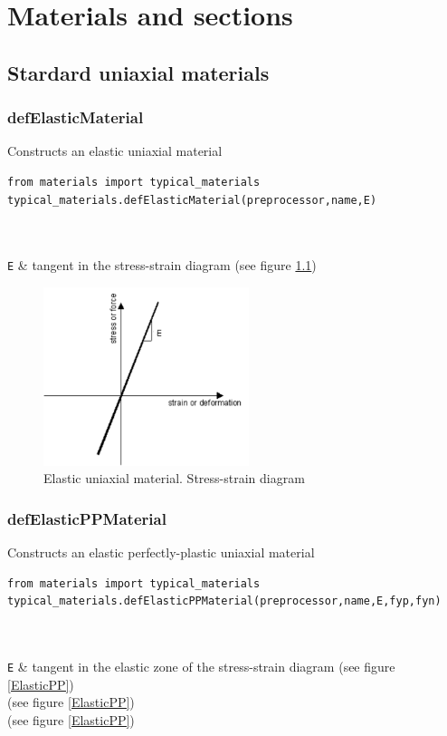 \chapter{Materials and sections}
\section{Stardard uniaxial materials}
\subsection{defElasticMaterial} 
\noindent Constructs an elastic uniaxial material
\begin{verbatim}
from materials import typical_materials
typical_materials.defElasticMaterial(preprocessor,name,E)
\end{verbatim}
\begin{paramFuncTable}
\preprocessor{} \\
 \\
{\tt E} & tangent in the stress-strain diagram (see figure \ref{Elastic}) \\
\end{paramFuncTable}

\begin{figure}[h]
\centering
\includegraphics[width=60mm]{materials/figures/Elastic}
\caption{Elastic uniaxial material. Stress-strain diagram}\label{Elastic}
\end{figure}

\subsection{defElasticPPMaterial}
\noindent Constructs an elastic perfectly-plastic uniaxial material
\begin{verbatim}
from materials import typical_materials
typical_materials.defElasticPPMaterial(preprocessor,name,E,fyp,fyn)
\end{verbatim}
\begin{paramFuncTable}
\preprocessor{} \\
 \\
{\tt E} & tangent in the elastic zone of the stress-strain diagram (see figure \ref{ElasticPP}) \\
\fyp{} (see figure \ref{ElasticPP}) \\
\fyn{} (see figure \ref{ElasticPP}) \\
\end{paramFuncTable}

